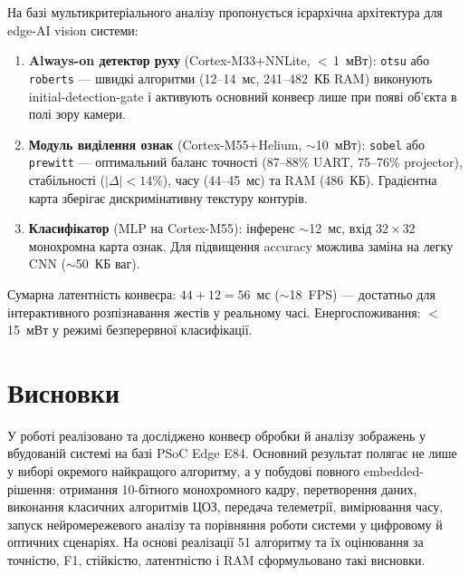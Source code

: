 \documentclass[a4paper,12pt]{article}
\let\oldsection\section
\renewcommand{\section}{\clearpage\oldsection}
\begin{document}
На базі мультикритеріального аналізу пропонується ієрархічна архітектура для edge-AI vision системи:
\begin{enumerate}
	\item \textbf{Always-on детектор руху} (Cortex-M33+NNLite, $<$\,1~мВт): \texttt{otsu} або \texttt{roberts} --- швидкі алгоритми (12--14~мс, 241--482~КБ RAM) виконують initial-detection-gate і активують основний конвеєр лише при появі об'єкта в полі зору камери.
	\item \textbf{Модуль виділення ознак} (Cortex-M55+Helium, $\sim$10~мВт): \texttt{sobel} або \texttt{prewitt} --- оптимальний баланс точності (87--88\% UART, 75--76\% projector), стабільності ($|\Delta|<14\%$), часу (44--45~мс) та RAM (486~КБ). Градієнтна карта зберігає дискримінативну текстуру контурів.
	\item \textbf{Класифікатор} (MLP на Cortex-M55): інференс $\sim$12~мс, вхід $32\times32$ монохромна карта ознак. Для підвищення accuracy можлива заміна на легку CNN ($\sim$50~КБ ваг).
\end{enumerate}

Сумарна латентність конвеєра: $44+12=56$~мс ($\sim$18~FPS) --- достатньо для інтерактивного розпізнавання жестів у реальному часі. Енергоспоживання: $<$15~мВт у режимі безперервної класифікації.

\section{Висновки}

У роботі реалізовано та досліджено конвеєр обробки й аналізу зображень у вбудованій системі на базі PSoC\texttrademark{} Edge E84. Основний результат полягає не лише у виборі окремого найкращого алгоритму, а у побудові повного embedded-рішення: отримання 10-бітного монохромного кадру, перетворення даних, виконання класичних алгоритмів ЦОЗ, передача телеметрії, вимірювання часу, запуск нейромережевого аналізу та порівняння роботи системи у цифровому й оптичних сценаріях. На основі реалізації 51 алгоритму та їх оцінювання за точністю, F1, стійкістю, латентністю і RAM сформульовано такі висновки.
\end{document}

